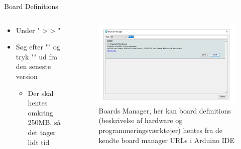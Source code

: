 \documentclass[aspectratio=169]{beamer}
\begin{document}
\begin{frame}{Board Definitions}
\begin{columns}
	\begin{column}{0.5\textwidth}
		\begin{textBox}
			\begin{itemize}
				\item Under " >  > "
				\item Søg efter "" og tryk "" ud fra den seneste version
				\begin{itemize}
					 \item Der skal hentes omkring 250MB, så det tager lidt tid
				\end{itemize}
			\end{itemize}
		\end{textBox}
	\end{column}
	\begin{column}{0.5\textwidth}
		\begin{figure}
  			\includegraphics[width=\textwidth]{assets/pictures/boardsmanager2.png}
  			\caption{Boards Manager, her kan board definitions (beskrivelse af hardware og programmeringsværktøjer) hentes fra de kendte board manager URLs i Arduino IDE}
  			\label{fig:boardmanager2}
		\end{figure}
	\end{column}
\end{columns}
\end{frame}
\end{document}

